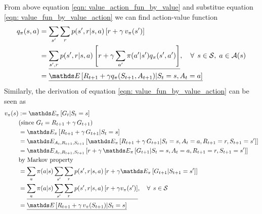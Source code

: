\documentclass[11pt]{article}
\begin{document}
From above equation \eqref{eqn: value_action_fun_by_value} and substitue equation \eqref{eqn: value_fun_by_value_action} we can find action-value function
\begin{align}
q_{\pi}(s, a) &= \sum_{s'}\sum_{r}p(s', r| s, a)\brac{r + \gamma\,v_{\pi}(s')} \nonumber\\
&= \underline{\sum_{s', r}p(s', r|s,a)\brac{r+ \gamma \sum_{a'}\pi(a'|s')q_{\pi}(s', a')}}, \quad \forall\,\; s\in \cS, \; a\in \cA(s) \label{eqn: bellman_eqn_value_action}\\
&= \underline{\E{}{R_{t+1} + \gamma q_{\pi}(S_{t+1}, A_{t+1}) | S_{t}=s, A_{t}=a}} \label{eqn: bellman_eqn_value_action2}
\end{align} Similarly, the derivation of equation \eqref{eqn: value_fun_by_value_action} can be seen as 
\begin{align}
v_{\pi}(s) &:= \E{\pi}{G_{t} | S_{t} = s} \nonumber\\
&(\text{since } G_{t} = R_{t+1} + \gamma\,G_{t+1})  \nonumber\\
&= \E{\pi}{R_{t+1}  + \gamma\,G_{t+1} | S_{t} = s}  \nonumber\\
&= \E{A_{t}, R_{t+1}, S_{t+1}}{\E{\pi}{R_{t+1}  + \gamma\,G_{t+1} | S_{t} = s, A_{t}=a, R_{t+1}=r, S_{t+1}=s'}}  \nonumber\\
&= \E{A_{t}, R_{t+1}, S_{t+1}}{r  + \gamma\,\E{\pi}{G_{t+1} | S_{t} = s, A_{t}=a, R_{t+1}=r, S_{t+1}=s'}}  \nonumber\\
&\text{by Markov property} \nonumber\\
&= \sum_{a}\pi(a|s)\sum_{s'}\sum_{r}p(s', r| s, a)\brac{r + \gamma \E{\pi}{G_{t+1} | S_{t+1} = s'}} \nonumber\\
&=  \underline{\sum_{a}\pi(a|s)\sum_{s'}\sum_{r}p(s', r| s, a)\brac{r + \gamma v_{\pi}(s')}}, \quad \forall\,\; s\in \cS \label{eqn: bellman_eqn_value}\\
&= \underline{\E{}{R_{t+1}  + \gamma\,v_{\pi}(S_{t+1}) | S_{t} = s}} \label{eqn: bellman_eqn_value2}
\end{align}
\end{document}
